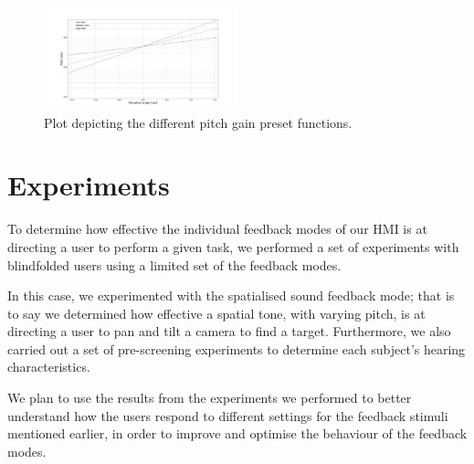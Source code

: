 \documentclass[format=sigconf, review=true, screen=true, anonymous=true]{acmart}
\begin{document}
\begin{figure}
  \centering
  \includegraphics[width=0.5\textwidth]{figures/pitch_gradient.pdf}
  \caption{Plot depicting the different pitch gain preset functions.}
  \label{fig:pitch-preset-plot}
\end{figure}

\section{Experiments}
\label{sec:experiments}

To determine how effective the individual feedback modes of our HMI is at directing a user to perform a given task, we performed a set of experiments with blindfolded users using a limited set of the feedback modes. %

In this case, we experimented with the spatialised sound feedback mode; that is to say we determined how effective a spatial tone, with varying pitch, is at directing a user to pan and tilt a camera to find a target. Furthermore, we also carried out a set of pre-screening experiments to determine each subject's hearing characteristics. %

We plan to use the results from the experiments we performed to better understand how the users respond to different settings for the feedback stimuli mentioned earlier, in order to improve and optimise the behaviour of the feedback modes.

\end{document}

